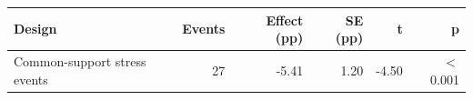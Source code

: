 \begin{tabular}{lrrrrr}
\toprule
Design & Events & Effect (pp) & SE (pp) & t & p \\
\midrule
Common-support stress events & 27 & -5.41 & 1.20 & -4.50 & \ensuremath{<}0.001 \\
\bottomrule
\end{tabular}

